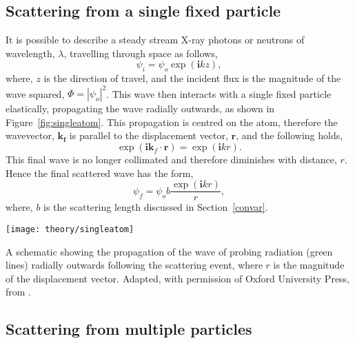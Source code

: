 \subsection{Scattering from a single fixed particle}
It is possible to describe a steady stream X-ray photons or neutrons of wavelength, $\lambda$, travelling through space as follows,
%
\begin{equation}
    \psi_i = \psi_o \exp{(\mathbf{i} kz)},
    \label{equ:wave}
\end{equation}
%
where, $z$ is the direction of travel, and the incident flux is the magnitude of the wave squared, $\Phi = |\psi_o|^2$.
This wave then interacts with a single fixed particle elastically, propagating the wave radially outwards, as shown in Figure~\ref{fig:singleatom}.
This propagation is centred on the atom, therefore the wavevector, $\mathbf{k_f}$ is parallel to the displacement vector, $\mathbf{r}$, and the following holds,
%
\begin{equation}
    \exp{(\mathbf{i}\mathbf{k}_f\cdot \mathbf{r})} = \exp{(\mathbf{i}kr)}.
\end{equation}
%
This final wave is no longer collimated and therefore diminishes with distance, $r$.
Hence the final scattered wave has the form,
%
\begin{equation}
    \psi_f = \psi_o b\frac{\exp{(\mathbf{i}kr)}}{r},
\end{equation}
%
where, $b$ is the scattering length discussed in Section~\ref{convar}.
%
\begin{marginfigure}[-6cm]
    \centering
    \texttt{[image: theory/singleatom]}
    \caption{A schematic showing the propagation of the wave of probing radiation (green lines) radially outwards following the scattering event, where $r$ is the magnitude of the displacement vector. Adapted, with permission of Oxford University Press, from \cite{sivia_elementary_2011}.}
    \label{fig:singleatom}
\end{marginfigure}
%

\subsection{Scattering from multiple particles}
\label{sec:multiscat}

